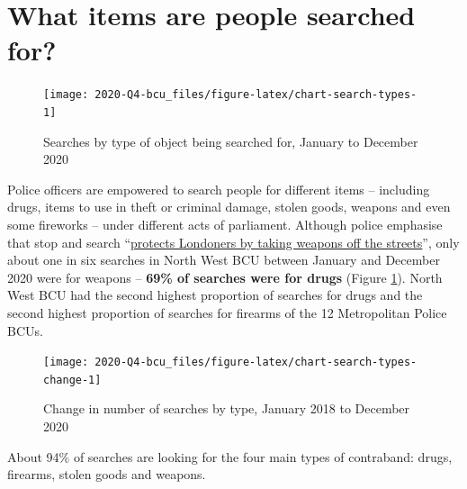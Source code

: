 \documentclass[
  a4paper,
  twoside, 11pt]{article}
\begin{document}
\hypertarget{what-items-are-people-searched-for}{%
\section{What items are people searched for?}\label{what-items-are-people-searched-for}}



\begin{figure}[h]

{\centering \texttt{[image: 2020-Q4-bcu\_files/figure-latex/chart-search-types-1]} 

}

\caption{Searches by type of object being searched for, January to December 2020}\label{fig:chart-search-types}
\end{figure}

Police officers are empowered to search people for different items -- including drugs, items to use in theft or criminal damage, stolen goods, weapons and even some fireworks -- under different acts of parliament. Although police emphasise that stop and search ``\href{https://www.met.police.uk/police-forces/metropolitan-police/areas/about-us/about-the-met/stop-and-search/}{protects Londoners by taking weapons off the streets}'', only about one in six searches in North West BCU between January and December 2020 were for weapons -- \textbf{69\% of searches were for drugs} (Figure \ref{fig:chart-search-types}). North West BCU had the second highest proportion of searches for drugs and the second highest proportion of searches for firearms of the 12 Metropolitan Police BCUs.



\begin{figure}[h]

{\centering \texttt{[image: 2020-Q4-bcu\_files/figure-latex/chart-search-types-change-1]} 

}

\caption{Change in number of searches by type, January 2018 to December 2020}\label{fig:chart-search-types-change}
\end{figure}

About 94\% of searches are looking for the four main types of contraband: drugs, firearms, stolen goods and weapons.
\end{document}

